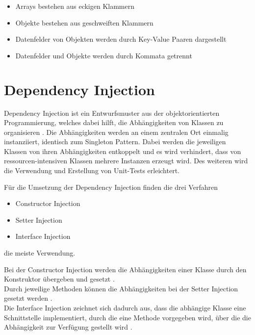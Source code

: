\begin{itemize}
	\item Arrays bestehen aus eckigen Klammern
	\item Objekte bestehen aus geschweiften Klammern
	\item Datenfelder von Objekten werden durch Key-Value Paaren dargestellt
	\item Datenfelder und Objekte werden durch Kommata getrennt
\end{itemize}
 
\section{Dependency Injection} \label{dependencyinjection}
Dependency Injection ist ein Entwurfsmuster aus der objektorientierten Programmierung, welches dabei hilft, die Abhängigkeiten von Klassen zu organisieren \cite[S.~27]{dependency-book}. Die Abhängigkeiten werden an einem zentralen Ort einmalig instanziiert, identisch zum Singleton Pattern. Dabei werden die jeweiligen Klassen von ihren Abhängigkeiten entkoppelt und es wird verhindert, dass von ressourcen-intensiven Klassen mehrere Instanzen erzeugt wird. Des weiteren wird die Verwendung und Erstellung von Unit-Tests erleichtert.

Für die Umsetzung der Dependency Injection finden die drei Verfahren
\begin{itemize}
	\item Constructor Injection
	\item Setter Injection
	\item Interface Injection
\end{itemize}
die meiste Verwendung.

Bei der Constructor Injection werden die Abhängigkeiten einer Klasse durch den Konstruktor übergeben und gesetzt \cite[S.~119]{dependency-book}.\\
Durch jeweilige Methoden können die Abhängigkeiten bei der Setter Injection gesetzt werden \cite[S.~120]{dependency-book}.\\
Die Interface Injection zeichnet sich dadurch aus, dass die abhängige Klasse eine Schnittstelle implementiert, durch die eine Methode vorgegeben wird, über die die Abhängigkeit zur Verfügung gestellt wird \cite[S.~120]{dependency-book}.

\clearpage

